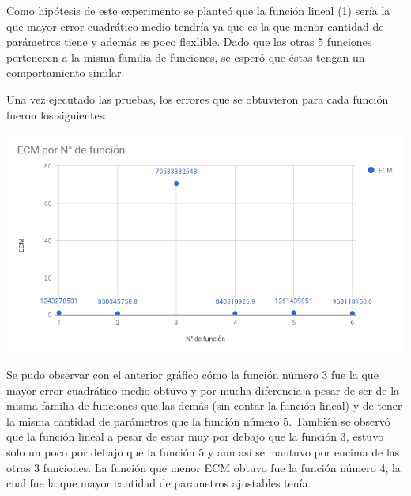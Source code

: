 Como hipótesis de este experimento se planteó que la función lineal (1) sería la que mayor error cuadrático medio tendría ya que es la que menor cantidad de parámetros tiene y además es poco flexlible. Dado que las otras 5 funciones pertenecen a la misma familia de funciones, se esperó que éstas tengan un comportamiento similar.

Una vez ejecutado las pruebas, los errores que se obtuvieron para cada función fueron los siguientes:

\includegraphics[scale=0.7,natwidth=403,natheight=735]{imagenes/ecm_por_fn.png}

Se pudo observar con el anterior gráfico cómo la función número 3 fue la que mayor error cuadrático medio obtuvo y por mucha diferencia a pesar de ser de la misma familia de funciones que las demás (sin contar la función lineal) y de tener la misma cantidad de parámetros que la función número 5. También se observó que la función lineal a pesar de estar muy por debajo que la función 3, estuvo solo un poco por debajo que la función 5 y aun así se mantuvo por encima de las otras 3 funciones.
La función que menor ECM obtuvo fue la función número 4, la cual fue la que mayor cantidad de parametros ajustables tenía.
